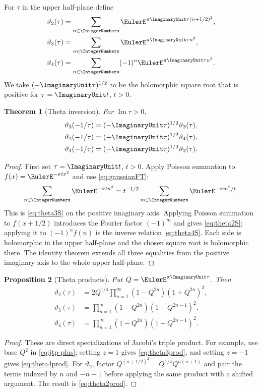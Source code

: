 \documentclass[11pt]{article}
\numberwithin{equation}{section}
\newtheorem{theorem}{Theorem}[section]
\newtheorem{proposition}[theorem]{Proposition}
\theoremstyle{definition}
\theoremstyle{remark}
\begin{document}
For $\tau$ in the upper half-plane define
\begin{align*}
\vartheta_2(\tau)&=\sum_{n\in\IntegerNumbers}\EulerE^{\pi\ImaginaryUnit\tau(n+1/2)^2},\\
\vartheta_3(\tau)&=\sum_{n\in\IntegerNumbers}\EulerE^{\pi\ImaginaryUnit\tau n^2},\\
\vartheta_4(\tau)&=\sum_{n\in\IntegerNumbers}(-1)^n\EulerE^{\pi\ImaginaryUnit\tau n^2}.
\end{align*}
We take $(-\ImaginaryUnit\tau)^{1/2}$ to be the holomorphic square root that is positive
for $\tau=\ImaginaryUnit t$, $t>0$.

\begin{theorem}[Theta inversion]\label{thm:thetaS}
For $\operatorname{Im}\tau>0$,
\begin{align}
\vartheta_3(-1/\tau)&=(-\ImaginaryUnit\tau)^{1/2}\vartheta_3(\tau),\label{eq:theta3S}\\
\vartheta_2(-1/\tau)&=(-\ImaginaryUnit\tau)^{1/2}\vartheta_4(\tau),\label{eq:theta2S}\\
\vartheta_4(-1/\tau)&=(-\ImaginaryUnit\tau)^{1/2}\vartheta_2(\tau).\label{eq:theta4S}
\end{align}
\end{theorem}
\begin{proof}
First set $\tau=\ImaginaryUnit t$, $t>0$.  Apply Poisson summation to
$f(x)=\EulerE^{-\pi t x^2}$ and use \eqref{eq:gaussianFT}:
\[
\sum_{n\in\IntegerNumbers}\EulerE^{-\pi t n^2}
=t^{-1/2}\sum_{m\in\IntegerNumbers}\EulerE^{-\pi m^2/t}.
\]
This is \eqref{eq:theta3S} on the positive imaginary axis.  Applying Poisson
summation to $f(x+1/2)$ introduces the Fourier factor $(-1)^m$ and gives
\eqref{eq:theta2S}; applying it to $(-1)^nf(n)$ is the inverse relation
\eqref{eq:theta4S}.  Each side is holomorphic in the upper half-plane and the
chosen square root is holomorphic there.  The identity theorem extends all
three equalities from the positive imaginary axis to the whole upper
half-plane.
\end{proof}

\begin{proposition}[Theta products]\label{prop:thetaproducts}
Put $Q=\EulerE^{\pi\ImaginaryUnit\tau}$.  Then
\begin{align}
\vartheta_2(\tau)&=2Q^{1/4}
\prod_{n=1}^{\infty}(1-Q^{2n})(1+Q^{2n})^2,\label{eq:theta2prod}\\
\vartheta_3(\tau)&=
\prod_{n=1}^{\infty}(1-Q^{2n})(1+Q^{2n-1})^2,\label{eq:theta3prod}\\
\vartheta_4(\tau)&=
\prod_{n=1}^{\infty}(1-Q^{2n})(1-Q^{2n-1})^2.\label{eq:theta4prod}
\end{align}
\end{proposition}
\begin{proof}
These are direct specializations of Jacobi's triple product.  For example,
use base $Q^2$ in \eqref{eq:jtp-plus}; setting $z=1$ gives
\eqref{eq:theta3prod}, and setting $z=-1$ gives
\eqref{eq:theta4prod}.  For $\vartheta_2$, factor
$Q^{(n+1/2)^2}=Q^{1/4}Q^{n(n+1)}$ and pair the terms indexed by $n$ and
$-n-1$ before applying the same product with a shifted argument.  The result
is \eqref{eq:theta2prod}.
\end{proof}
\end{document}
